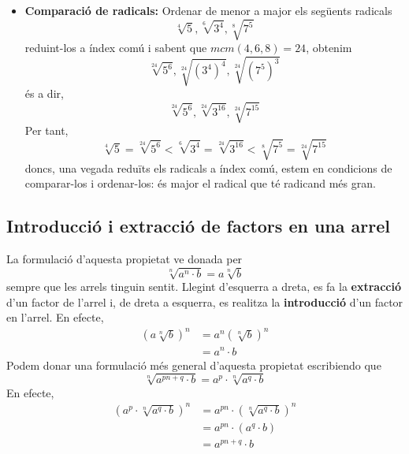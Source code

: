 \begin{itemize}
\item \textbf{Comparació de radicals:} Ordenar de menor a major els
següents radicals%
\begin{equation*}
\sqrt[4]{5},\sqrt[6]{3^{4}},\sqrt[8]{7^{5}}
\end{equation*}%
reduint-los a índex comú i sabent que $mcm(4,6,8)=24$,
obtenim%
\begin{equation*}
\sqrt[24]{5^{6}},\sqrt[24]{\left( 3^{4}\right) ^{4}},\sqrt[24]{\left(
7^{5}\right) ^{3}}
\end{equation*}%
és a dir,%
\begin{equation*}
\sqrt[24]{5^{6}},\sqrt[24]{3^{16}},\sqrt[24]{7^{15}}
\end{equation*}%
Per tant,%
\begin{equation*}
\sqrt[4]{5}=\sqrt[24]{5^{6}}<\sqrt[6]{3^{4}}=\sqrt[24]{3^{16}}<\sqrt[8]{7^{5}%
}=\sqrt[24]{7^{15}}
\end{equation*}%
doncs, una vegada reduïts els radicals a índex comú, estem en
condicions de comparar-los i ordenar-los: és major el radical que té
radicand més gran.
\end{itemize}

\subsection{Introducció i extracció de factors en una arrel}

La formulació d’aquesta propietat ve donada per%
\begin{equation*}
\sqrt[n]{a^{n}\cdot b}=a\sqrt[n]{b}
\end{equation*}%
sempre que les arrels tinguin sentit. Llegint d’esquerra a dreta,
es fa la \textbf{extracció} d’un factor de l’arrel i, de
dreta a esquerra, es realitza la \textbf{introducció} d’un factor en
l’arrel. En efecte,%
\begin{align*}
\left( a\sqrt[n]{b}\right) ^{n} &=a^{n}\left( \sqrt[n]{b}\right) ^{n} \\
&=a^{n}\cdot b
\end{align*}%
Podem donar una formulació més general d’aquesta propietat
escribiendo que%
\begin{equation*}
\sqrt[n]{a^{pn+q}\cdot b}=a^{p}\cdot \sqrt[n]{a^{q}\cdot b}
\end{equation*}%
En efecte,%
\begin{align*}
\left( a^{p}\cdot \sqrt[n]{a^{q}\cdot b}\right) ^{n} &=a^{pn}\cdot \left( 
\sqrt[n]{a^{q}\cdot b}\right) ^{n} \\
&=a^{pn}\cdot \left( a^{q}\cdot b\right) \\
&=a^{pn+q}\cdot b
\end{align*}


